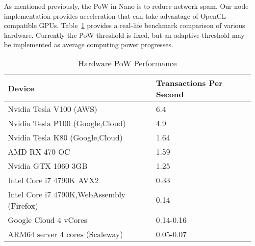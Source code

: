 As mentioned previously, the PoW in Nano is to reduce network spam.  Our node implementation provides acceleration that can take advantage of OpenCL compatible GPUs. Table~\ref{table:hardware_pow} provides a real-life benchmark comparison of various hardware. Currently the PoW threshold is fixed, but an adaptive threshold may be implemented as average computing power progresses.

\begin{table}[!ht]
\centering
\caption{Hardware PoW Performance}
\label{table:hardware_pow}
\begin{tabular}{ll}
Device                                    & Transactions Per Second \\
\hline
Nvidia Tesla V100 (AWS)                   & 6.4                     \\
Nvidia Tesla P100 (Google,Cloud)          & 4.9                     \\
Nvidia Tesla K80 (Google,Cloud)           & 1.64                    \\
AMD RX 470 OC                             & 1.59                    \\
Nvidia GTX 1060 3GB                       & 1.25                    \\
Intel Core i7 4790K AVX2                  & 0.33                    \\
Intel Core i7 4790K,WebAssembly (Firefox) & 0.14                    \\
Google Cloud 4 vCores                     & 0.14-0.16               \\
ARM64 server 4 cores (Scaleway)           & 0.05-0.07               \\
\end{tabular}
\end{table}